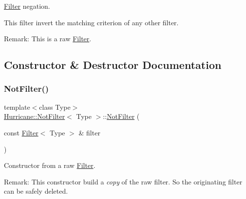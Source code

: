 \hyperlink{classHurricane_1_1Filter}{Filter} negation. 

This filter invert the matching criterion of any other filter.

\begin{DoxyParagraph}{Remark\+:}
This is a raw \hyperlink{classHurricane_1_1Filter}{Filter}. 
\end{DoxyParagraph}


\subsection{Constructor \& Destructor Documentation}
\mbox{\label{classHurricane_1_1NotFilter_a8c75f2e192929c1b559f4ca876e47126}} 
\subsubsection{\texorpdfstring{Not\+Filter()}{NotFilter()}\hspace{0.1cm}{\footnotesize\ttfamily [1/2]}}
{\footnotesize\ttfamily template$<$class Type$>$ \\
\hyperlink{classHurricane_1_1NotFilter}{Hurricane\+::\+Not\+Filter}$<$ Type $>$\+::\hyperlink{classHurricane_1_1NotFilter}{Not\+Filter} (\begin{DoxyParamCaption}\item[{const \hyperlink{classHurricane_1_1Filter}{Filter}$<$ Type $>$ \&}]{filter }\end{DoxyParamCaption})\hspace{0.3cm}{\ttfamily [inline]}}

Constructor from a raw \hyperlink{classHurricane_1_1Filter}{Filter}.

\begin{DoxyParagraph}{Remark\+:}
This constructor build a {\itshape copy} of the raw filter. So the originating filter can be safely deleted. 
\end{DoxyParagraph}
\mbox{\label{classHurricane_1_1NotFilter_a232102dc584111a704e66b2ac793af86}} 
